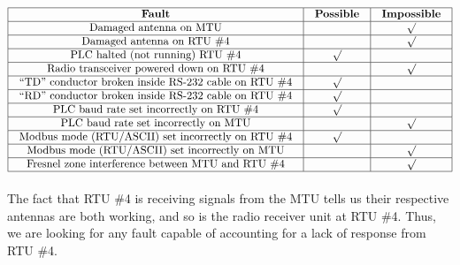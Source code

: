 






$$\vbox{\offinterlineskip
\halign{\strut
\vrule \quad\hfil # \ \hfil & 
\vrule \quad\hfil # \ \hfil & 
\vrule \quad\hfil # \ \hfil \vrule \cr
\noalign{\hrule}
%
{\bf Fault} & {\bf Possible} & {\bf Impossible} \cr
%
\noalign{\hrule}
%
Damaged antenna on MTU &  & $\surd$ \cr
%
\noalign{\hrule}
%
Damaged antenna on RTU \#4 &  & $\surd$ \cr
%
\noalign{\hrule}
%
PLC halted (not running) RTU \#4 & $\surd$ &  \cr
%
\noalign{\hrule}
%
Radio transceiver powered down on RTU \#4 &  & $\surd$ \cr
%
\noalign{\hrule}
%
``TD'' conductor broken inside RS-232 cable on RTU \#4 & $\surd$ &  \cr
%
\noalign{\hrule}
%
``RD'' conductor broken inside RS-232 cable on RTU \#4 & $\surd$ &  \cr
%
\noalign{\hrule}
%
PLC baud rate set incorrectly on RTU \#4 & $\surd$ &  \cr
%
\noalign{\hrule}
%
PLC baud rate set incorrectly on MTU &  & $\surd$ \cr
%
\noalign{\hrule}
%
Modbus mode (RTU/ASCII) set incorrectly on RTU \#4 & $\surd$ &  \cr
%
\noalign{\hrule}
%
Modbus mode (RTU/ASCII) set incorrectly on MTU &  & $\surd$ \cr
%
\noalign{\hrule}
%
Fresnel zone interference between MTU and RTU \#4 &  & $\surd$ \cr
%
\noalign{\hrule}
} %
}$$ %


The fact that RTU \#4 is receiving signals from the MTU tells us their respective antennas are both working, and so is the radio receiver unit at RTU \#4.  Thus, we are looking for any fault capable of accounting for a lack of response from RTU \#4.



